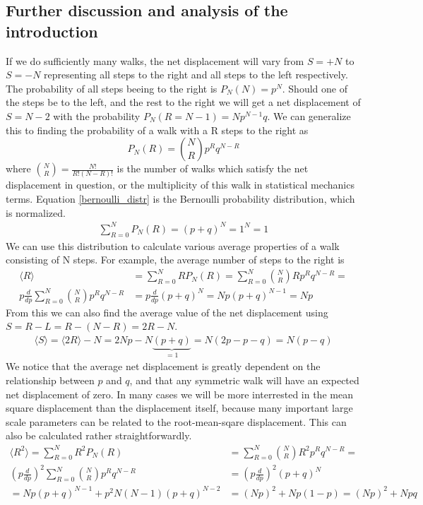 \subsection{Further discussion and analysis of the introduction}\label{further_introduction}
If we do sufficiently many walks, the net displacement will vary from $S=+N$ to $S=-N$ representing all steps to the right and all steps to the left respectively. 
The probability of all steps beeing to the right is $P_N(N) = p^N$. 
Should one of the steps be to the left, and the rest to the right we will get a net displacement of $S = N-2$ with the probability $P_N(R = N-1) = Np^{N-1}q$. 
We can generalize this to finding the probability of a walk with a R steps to the right as 
\begin{equation}\label{bernoulli_distr}
 P_N(R) = {N\choose R}p^{R}q^{N-R}
\end{equation}
where ${N\choose R}=\frac{N!}{R!(N-R)!}$ is the number of walks which satisfy the net displacement in question, or the multiplicity of this walk in statistical mechanics terms. 
Equation \ref{bernoulli_distr} is the Bernoulli probability distribution, which is normalized.
\begin{align*}
 \sum\limits_{R=0}^N P_N(R) = (p+q)^N = 1^N = 1
\end{align*}
We can use this distribution to calculate various average properties of a walk consisting of N steps. 
For example, the average number of steps to the right is
\begin{align*}
 \langle R\rangle &=  \sum\limits_{R=0}^N RP_N(R) =  \sum\limits_{R=0}^N {N\choose R}Rp^Rq^{N-R} = \\
 p\frac{d}{dp} \sum\limits_{R=0}^N {N\choose R}p^Rq^{N-R} &= p\frac{d}{dp}(p+q)^N = Np(p+q)^{N-1} = Np
\end{align*}
From this we can also find the average value of the net displacement using $S = R-L = R-(N-R) = 2R-N$.
\begin{align*}
 \langle S\rangle = \langle2R\rangle -N = 2Np-N\underbrace{(p+q)}_{=1} = N(2p-p-q) = N(p-q)
\end{align*}
We notice that the average net displacement is greatly dependent on the relationship between $p$ and $q$, and that any symmetric walk will have an expected net displacement of zero. 
In many cases we will be more interrested in the mean square displacement than the displacement itself, because many important large scale parameters can be related to the root-mean-sqare displacement. 
This can also be calculated rather straightforwardly. 
\begin{align*}
  \langle R^2\rangle =  \sum\limits_{R=0}^N R^2P_N(R) &=  \sum\limits_{R=0}^N {N\choose R}R^2p^Rq^{N-R} = \\
 \left(p\frac{d}{dp}\right)^2 \sum\limits_{R=0}^N {N\choose R}p^Rq^{N-R} &= \left(p\frac{d}{dp}\right)^2(p+q)^N \\
 = Np(p+q)^{N-1} +p^2N(N-1)(p+q)^{N-2} &= (Np)^2 +Np(1-p) = (Np)^2 +Npq
\end{align*}
